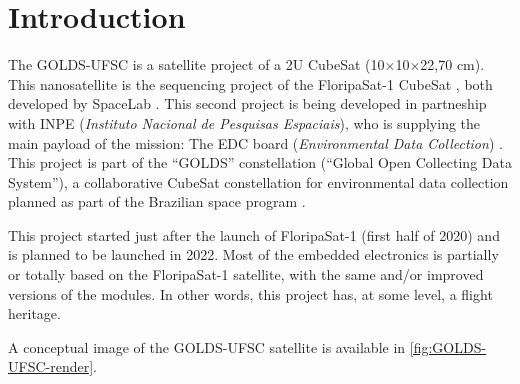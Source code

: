 %
%
%
%
%

%
%
%
%
%
%

\chapter{Introduction} \label{ch:introduction}

The GOLDS-UFSC is a satellite project of a 2U CubeSat (10$\times$10$\times$22,70 cm). This nanosatellite is the sequencing project of the FloripaSat-1 CubeSat \cite{floripasat}, both developed by SpaceLab \cite{spacelab}. This second project is being developed in partneship with INPE (\textit{Instituto Nacional de Pesquisas Espaciais}), who is supplying the main payload of the mission: The EDC board (\textit{Environmental Data Collection}) \cite{edc}. This project is part of the ``GOLDS'' constellation (``Global Open Collecting Data System''), a collaborative CubeSat constellation for environmental data collection planned as part of the Brazilian space program \cite{golds}.

This project started just after the launch of FloripaSat-1 (first half of 2020) and is planned to be launched in 2022. Most of the embedded electronics is partially or totally based on the FloripaSat-1 satellite, with the same and/or improved versions of the modules. In other words, this project has, at some level, a flight heritage.

A conceptual image of the GOLDS-UFSC satellite is available in \autoref{fig:GOLDS-UFSC-render}.

